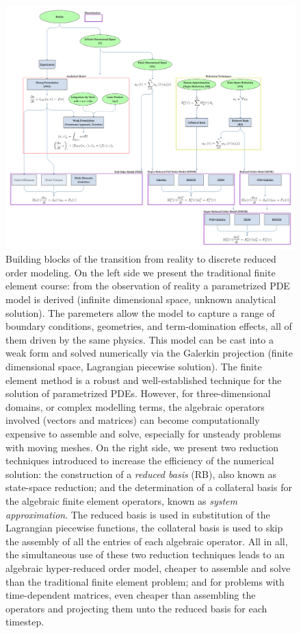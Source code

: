 \onecolumn
\begin{figure}[h]
   \includegraphics[width=\columnwidth]{graphs/From-Reality-To-ROM.png}
   \caption{Building blocks of the transition from reality to discrete 
   reduced order modeling.
   On the left side we present the traditional finite element course: 
   from the observation of reality a parametrized PDE model is derived 
   (infinite dimensional space, unknown analytical solution).
   The paremeters allow the model to capture a range of 
   boundary conditions, geometries,
   and term-domination effects, 
   all of them driven by the same physics.
   This model can be cast into a weak form and 
   solved numerically via the Galerkin projection 
   (finite dimensional space, Lagrangian piecewise solution).
   The finite element method is a robust and well-established technique
   for the solution of parametrized PDEs.
   However, for three-dimensional domains, 
   or complex modelling terms, the algebraic operators involved (vectors and matrices) 
   can become computationally expensive to assemble and solve,
   especially for unsteady problems with moving meshes.
   On the right side, we present two reduction techniques introduced 
   to increase the efficiency of the numerical solution:
   the construction of a \textit{reduced basis} (RB), also known as state-space reduction;
   and the determination of a collateral basis for 
   the algebraic finite element operators, known as \textit{system approximation}.
   The reduced basis is used in substitution of the Lagrangian piecewise functions,
   the collateral basis is used to skip the assembly 
   of all the entries of each algebraic operator.
   All in all, the simultaneous use of these two reduction techniques 
   leads to an algebraic hyper-reduced order model,
   cheaper to assemble and solve than the traditional finite element problem;
   and for problems with time-dependent matrices,
   even cheaper than assembling the operators and projecting them
   unto the reduced basis for each timestep.}
   \label{fig:overview_graph}
 \end{figure}
 \twocolumn